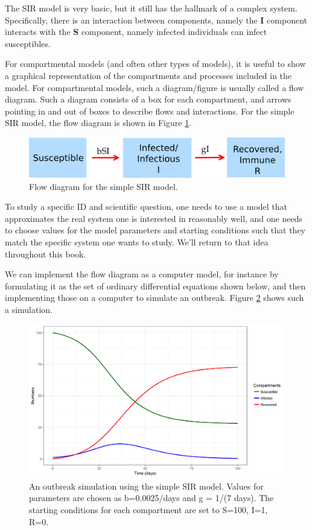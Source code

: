 \documentclass[]{book}
\theoremstyle{definition}
\theoremstyle{definition}
\theoremstyle{definition}
\theoremstyle{remark}
\begin{document}
The SIR model is very basic, but it still has the hallmark of a complex
system. Specifically, there is an interaction between components, namely
the \textbf{I} component interacts with the \textbf{S} component, namely
infected individuals can infect susceptibles.

For compartmental models (and often other types of models), it is useful
to show a graphical representation of the compartments and processes
included in the model. For compartmental models, such a diagram/figure
is usually called a flow diagram. Such a diagram consists of a box for
each compartment, and arrows pointing in and out of boxes to describe
flows and interactions. For the simple SIR model, the flow diagram is
shown in Figure \ref{fig:basicSIR}.

\begin{figure}
\centering
\includegraphics{./images/basicSIRmodelfigure.png}
\caption{\label{fig:basicSIR}Flow diagram for the simple SIR model.}
\end{figure}

To study a specific ID and scientific question, one needs to use a model
that approximates the real system one is interested in reasonably well,
and one needs to choose values for the model parameters and starting
conditions such that they match the specific system one wants to study.
We'll return to that idea throughout this book.

We can implement the flow diagram as a computer model, for instance by
formulating it as the set of ordinary differential equations shown
below, and then implementing those on a computer to simulate an
outbreak. Figure \ref{fig:sirsim} shows such a simulation.

\begin{figure}
\centering
\includegraphics{./images/sirsim.png}
\caption{\label{fig:sirsim}An outbreak simulation using the simple SIR
model. Values for parameters are chosen as b=0.0025/days and g = 1/(7
days). The starting conditions for each compartment are set to S=100,
I=1, R=0.}
\end{figure}
\end{document}
